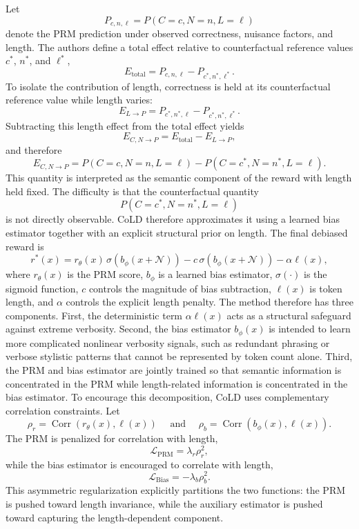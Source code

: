 \documentclass[11pt]{article}
\begin{document}
Let
\[
P_{c,n,\ell}
=
P(C=c,N=n,L=\ell)
\]
denote the PRM prediction under observed correctness, nuisance factors, and length. The authors define a total effect relative to counterfactual reference values $c^*$, $n^*$, and $\ell^*$,
\[
E_{\mathrm{total}}
=
P_{c,n,\ell}
-
P_{c^*,n^*,\ell^*}.
\]
To isolate the contribution of length, correctness is held at its counterfactual reference value while length varies:
\[
E_{L\rightarrow P}
=
P_{c^*,n^*,\ell}
-
P_{c^*,n^*,\ell^*}.
\]
Subtracting this length effect from the total effect yields
\[
E_{C,N\rightarrow P}
=
E_{\mathrm{total}}
-
E_{L\rightarrow P},
\]
and therefore
\[
E_{C,N\rightarrow P}
=
P(C=c,N=n,L=\ell)
-
P(C=c^*,N=n^*,L=\ell).
\]
This quantity is interpreted as the semantic component of the reward with length held fixed. The difficulty is that the counterfactual quantity
\[
P(C=c^*,N=n^*,L=\ell)
\]
is not directly observable. CoLD therefore approximates it using a learned bias estimator together with an explicit structural prior on length.
The final debiased reward is
\[
r^*(x)
=
r_\theta(x)\,
\sigma\!\left(
b_\phi(x+\mathcal{N})
\right)
-
c\,
\sigma\!\left(
b_\phi(x+\mathcal{N})
\right)
-
\alpha \ell(x),
\]
where $r_\theta(x)$ is the PRM score, $b_\phi$ is a learned bias estimator, $\sigma(\cdot)$ is the sigmoid function, $c$ controls the magnitude of bias subtraction, $\ell(x)$ is token length, and $\alpha$ controls the explicit length penalty.
The method therefore has three components. First, the deterministic term
$
\alpha \ell(x)
$
acts as a structural safeguard against extreme verbosity. Second, the bias estimator $b_\phi(x)$ is intended to learn more complicated nonlinear verbosity signals, such as redundant phrasing or verbose stylistic patterns that cannot be represented by token count alone. Third, the PRM and bias estimator are jointly trained so that semantic information is concentrated in the PRM while length-related information is concentrated in the bias estimator.
To encourage this decomposition, CoLD uses complementary correlation constraints. Let
\[
\rho_r
=
\operatorname{Corr}
\left(
r_\theta(x),\ell(x)
\right)
\quad
\text{ and }
\quad
\rho_b
=
\operatorname{Corr}
\left(
b_\phi(x),\ell(x)
\right).
\]
The PRM is penalized for correlation with length,
\[
\mathcal{L}_{\mathrm{PRM}}
=
\lambda_r \rho_r^2,
\]
while the bias estimator is encouraged to correlate with length,
\[
\mathcal{L}_{\mathrm{Bias}}
=
-\lambda_b \rho_b^2.
\]
This asymmetric regularization explicitly partitions the two functions: the PRM is pushed toward length invariance, while the auxiliary estimator is pushed toward capturing the length-dependent component.
\end{document}
